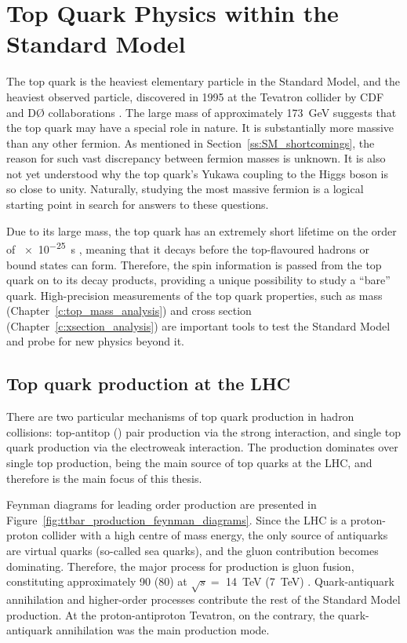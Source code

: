 \newpage
\section{Top Quark Physics within the Standard Model}
\label{s:top_quak_physics}
The top quark is the heaviest elementary particle in the Standard Model, and the heaviest observed particle, discovered
in 1995 at the Tevatron collider by CDF and D{\O} collaborations \autocite{CDF_top_observation, D0_top_observation}. The
large mass of approximately \SI{173}{\GeV} suggests that the top quark may have a special role in nature. It is
substantially more massive than any other fermion. As mentioned in Section~\ref{ss:SM_shortcomings}, the reason for such
vast discrepancy between fermion masses is unknown. It is also not yet understood why the top quark's Yukawa coupling to
the Higgs boson is so close to unity. Naturally, studying the most massive fermion is a logical starting point in search
for answers to these questions.

Due to its large mass, the top quark has an extremely short lifetime on the order of \SI{e-25}{\s} \autocite{PDG},
meaning that it decays before the top-flavoured hadrons or \ttbar bound states can form. Therefore, the spin information
is passed from the top quark on to its decay products, providing a unique possibility to study a ``bare'' quark.
High-precision measurements of the top quark properties, such as mass (Chapter~\ref{c:top_mass_analysis}) and cross
section (Chapter~\ref{c:xsection_analysis}) are important tools to test the Standard Model and probe for new physics
beyond it.

\subsection{Top quark production at the LHC}
\label{ss:top_production}
There are two particular mechanisms of top quark production in hadron collisions: top-antitop (\ttbar) pair production
via the strong interaction, and single top quark production via the electroweak interaction. The \ttbar production
dominates over single top production, being the main source of top quarks at the LHC, and therefore is the main focus of
this thesis.

Feynman diagrams for leading order \ttbar production are presented in
Figure~\ref{fig:ttbar_production_feynman_diagrams}. Since the LHC is a proton-proton collider with a high centre of mass
energy, the only source of antiquarks are virtual quarks (so-called sea quarks), and the gluon contribution becomes
dominating. Therefore, the major process for \ttbar production is gluon fusion, constituting approximately \SI{90}{\pc}
(\SI{80}{\pc}) at $\sqrt s =$ \SI{14}{\TeV} (\SI{7}{\TeV}) \autocite{PDG}. Quark-antiquark annihilation and higher-order
processes contribute the rest of the Standard Model \ttbar production. At the proton-antiproton Tevatron, on the
contrary, the quark-antiquark annihilation was the main \ttbar production mode.

